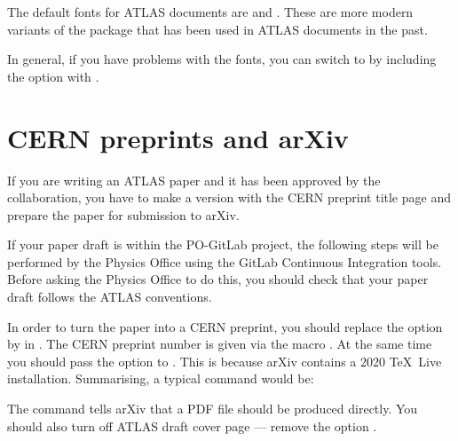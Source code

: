 The default fonts for ATLAS documents are  and .
These are more modern variants of the package  that has been used in
ATLAS documents in the past.

In general, if you have problems with the  fonts,
you can switch to  by including the option  with .


\section{CERN preprints and arXiv}
\label{sec:preprint}

If you are writing an ATLAS paper and it has been approved by the collaboration,
you have to make a version with the CERN preprint title page and prepare the 
paper for submission to arXiv.

If your paper draft is within the PO-GitLab project, the following steps will be
performed by the Physics Office using the GitLab Continuous Integration tools.
Before asking the Physics Office to do this,
you should check that your paper draft follows the ATLAS conventions.

In order to turn the paper into a CERN preprint,
you should replace the option  by  in .
The CERN preprint number is given via the macro .
At the same time you should pass the option  to
.
This is because arXiv contains a 2020 \TeX\ Live installation.
Summarising, a typical  command would be:
The  command tells arXiv that a PDF file should be produced directly.
You should also turn off ATLAS draft cover page --- remove the option .

